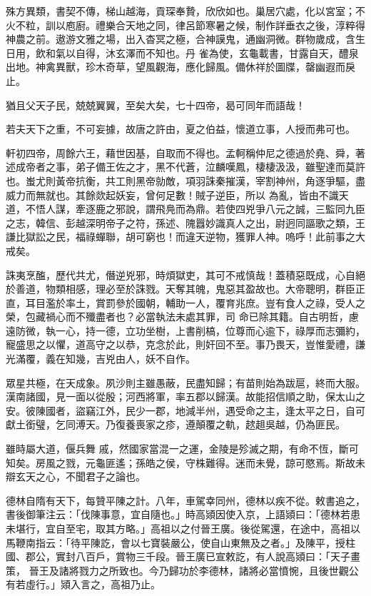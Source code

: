 \begin{pinyinscope}
 殊方異類，書契不傳，梯山越海，貢琛奉贄，欣欣如也。巢居穴處，化以宮室；不火不粒，訓以庖廚。禮樂合天地之同，律呂節寒暑之候，制作詳垂衣之後，淳粹得神農之前。遨游文雅之場，出入杳冥之極，合神謨鬼，通幽洞微。群物歲成，含生日用，飲和氣以自得，沐玄澤而不知也。丹
 雀為使，玄龜載書，甘露自天，醴泉出地。神禽異獸，珍木奇草，望風觀海，應化歸風。備休祥於圖牒，罄幽遐而戾止。



 猶且父天子民，兢兢翼翼，至矣大矣，七十四帝，曷可同年而語哉！



 若夫天下之重，不可妄據，故唐之許由，夏之伯益，懷道立事，人授而弗可也。



 軒初四帝，周餘六王，藉世因基，自取而不得也。孟軻稱仲尼之德過於堯、舜，著述成帝者之事，弟子備王佐之才，黑不代蒼，泣麟嘆鳳，棲棲汲汲，雖聖達而莫許也。蚩尤則黃帝抗衡，共工則黑帝勍敵，項羽誅秦摧漢，宰割神州，角逐爭驅，盡威力而無就也。其餘欻起妖妄，曾何足數！賊子逆臣，所以
 為亂，皆由不識天道，不悟人謀，牽逐鹿之邪說，謂飛鳧而為鼎。若使四兇爭八元之誠，三監同九臣之志，韓信、彭越深明帝子之符，孫述、隗囂妙識真人之出，尉迥同謳歌之類，王謙比獄訟之民，福祿蟬聯，胡可窮也！而違天逆物，獲罪人神。嗚呼！此前事之大戒矣。



 誅夷烹醢，歷代共尤，僭逆兇邪，時煩獄吏，其可不戒慎哉！蓋積惡既成，心自絕於善道，物類相感，理必至於誅戮。天奪其魄，鬼惡其盈故也。大帝聰明，群臣正直，耳目濫於率土，賞罰參於國朝，輔助一人，覆育兆庶。豈有食人之祿，受人之榮，包藏禍心而不殲盡者也？必當執法未處其罪，司
 命已除其籍。自古明哲，慮遠防微，執一心，持一德，立功坐樹，上書削槁，位尊而心逾下，祿厚而志彌約，寵盛思之以懼，道高守之以恭，克念於此，則奸回不至。事乃畏天，豈惟愛禮，謙光滿覆，義在知幾，吉兇由人，妖不自作。



 眾星共極，在天成象。夙沙則主雖愚蔽，民盡知歸；有苗則始為跋扈，終而大服。漢南諸國，見一面以從殷；河西將軍，率五郡以歸漢。故能招信順之助，保太山之安。彼陳國者，盜竊江外，民少一郡，地減半州，遇受命之主，逢太平之日，自可獻土銜璧，乞同溥天。乃復養喪家之疹，遵顛覆之軌，趑趄吳越，仍為匪民。



 雖時屬大道，偃兵舞
 戚，然國家當混一之運，金陵是殄滅之期，有命不恆，斷可知矣。房風之戮，元龜匪遙；孫皓之侯，守株難得。迷而未覺，諒可愍焉。斯故未辯玄天之心，不聞君子之論也。



 德林自隋有天下，每贊平陳之計。八年，車駕幸同州，德林以疾不從。敕書追之，書後御筆注云：「伐陳事意，宜自隨也。」時高熲因使入京，上語熲曰：「德林若患未堪行，宜自至宅，取其方略。」高祖以之付晉王廣。後從駕還，在途中，高祖以馬鞭南指云：「待平陳訖，會以七寶裝嚴公，使自山東無及之者。」及陳平，授柱國、郡公，實封八百戶，賞物三千段。晉王廣已宣敕訖，有人說高熲曰：「天子畫策，
 晉王及諸將戮力之所致也。今乃歸功於李德林，諸將必當憤惋，且後世觀公有若虛行。」熲入言之，高祖乃止。




\end{pinyinscope}
